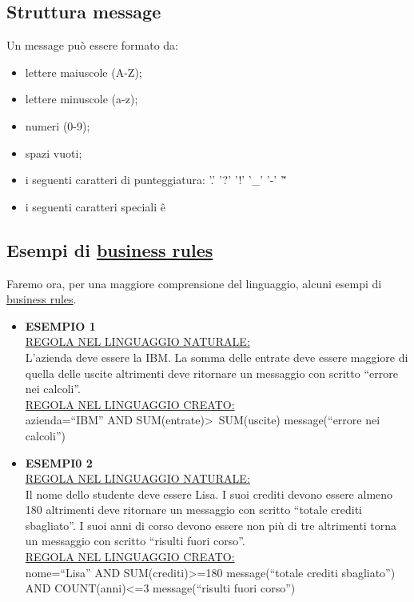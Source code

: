 \subsection{Struttura message}
Un message pu\`o essere formato da:
\begin{itemize}
\item lettere maiuscole (A-Z);
\item lettere minuscole (a-z);
\item numeri (0-9);
\item spazi vuoti;
\item i seguenti caratteri di punteggiatura: '.'  '?'  '!'  '\_'  '-'  '\~'
\item i seguenti caratteri speciali \^ e \~ \\
\end{itemize}
\subsection{Esempi di \underline{business rules}}
Faremo ora, per una maggiore comprensione del linguaggio, alcuni esempi di \underline{business rules}.
\begin{itemize}
\item \textbf{ESEMPIO 1} \\
\underline{REGOLA NEL LINGUAGGIO NATURALE:} \\
L'azienda deve essere la IBM. La somma delle entrate deve essere maggiore di quella delle uscite altrimenti deve ritornare un messaggio con scritto ``errore nei calcoli''. \\
\underline{REGOLA NEL LINGUAGGIO CREATO:} \\
azienda=``IBM'' AND SUM(entrate)\textgreater\ SUM(uscite) message(``errore nei calcoli'')
\item \textbf{ESEMPI0 2} \\
\underline{REGOLA NEL LINGUAGGIO NATURALE:} \\
Il nome dello studente deve essere Lisa. I suoi crediti devono essere almeno 180 altrimenti deve ritornare un messaggio con scritto ``totale crediti sbagliato''. I suoi anni di corso devono essere non pi\`u di tre altrimenti torna un messaggio con scritto ``risulti fuori corso''.  \\
\underline{REGOLA NEL LINGUAGGIO CREATO:} \\
nome=``Lisa'' AND SUM(crediti)\textgreater =180 message(``totale crediti sbagliato'') AND COUNT(anni)\textless =3 message(``risulti fuori corso'')
\end{itemize}
